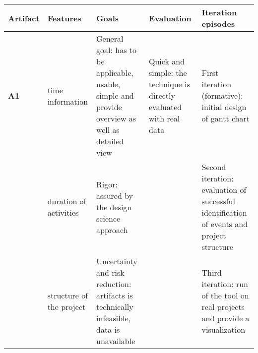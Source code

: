 \begin{longtable}[c]{@{}p{1cm}p{2.5cm}p{5cm}p{3cm}p{4cm}@{}}
\toprule
\textbf{Artifact} & \textbf{Features}                              & \textbf{Goals}                                                                                                                                                                                                                                                           & \textbf{Evaluation}                                                                                                                                  & \textbf{Iteration episodes}                                                                                                   \\* \midrule
\endhead
%
\bottomrule
\endfoot
%
\endlastfoot
%
\textbf{A1}       & time information                               & General goal: has to be applicable, usable, simple and provide overview as well as detailed view                                                                                                                                                                         & Quick and simple: the technique is directly evaluated with real data                                                                                 & First iteration (formative): initial design of gantt chart                                                                    \\
                  & duration of activities                         & Rigor: assured by the design science approach                                                                                                                                                                                                                            &                                                                                                                                                      & Second iteration: evaluation of successful identification of events and project structure                                     \\
                  & structure of the project                       & Uncertainty and risk reduction: artifacts is technically infeasible, data is unavailable                                                                                                                                                                                 &                                                                                                                                                      & Third iteration: run of the tool on real projects and provide a visualization                                                 \\

\end{longtable}
